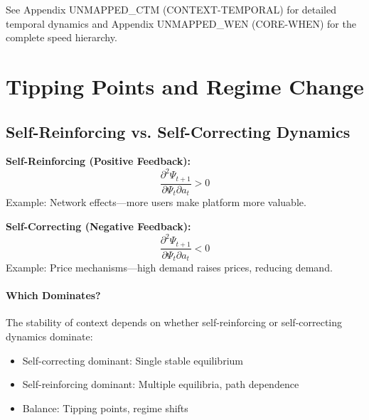 \begin{cross-reference}
See Appendix UNMAPPED_CTM (CONTEXT-TEMPORAL) for detailed temporal dynamics
and Appendix UNMAPPED_WEN (CORE-WHEN) for the complete speed hierarchy.
\end{cross-reference}



\section{Tipping Points and Regime Change}
\label{sec:context-tipping}


\subsection{Self-Reinforcing vs. Self-Correcting Dynamics}

\begin{definition}
\textbf{Self-Reinforcing (Positive Feedback):}
\begin{equation}
\frac{\partial^2 \Psi_{t+1}}{\partial \Psi_t \partial a_t} > 0
\end{equation}
Example: Network effects---more users make platform more valuable.

\textbf{Self-Correcting (Negative Feedback):}
\begin{equation}
\frac{\partial^2 \Psi_{t+1}}{\partial \Psi_t \partial a_t} < 0
\end{equation}
Example: Price mechanisms---high demand raises prices, reducing demand.
\end{definition}

\paragraph{Which Dominates?}
The stability of context depends on whether self-reinforcing or
self-correcting dynamics dominate:
\begin{itemize}[nosep]
  \item Self-correcting dominant: Single stable equilibrium
  \item Self-reinforcing dominant: Multiple equilibria, path dependence
  \item Balance: Tipping points, regime shifts
\end{itemize}

